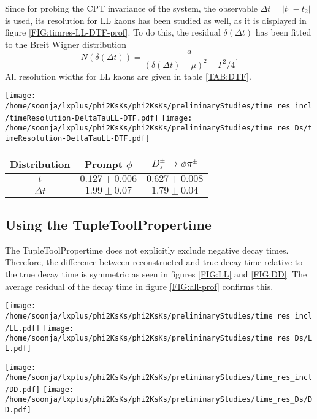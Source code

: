 Since for probing the CPT invariance of the system, the observable $\Delta t = |t_1 - t_2|$ is used, its resolution for LL kaons has been studied as well, as it is displayed in figure \ref{FIG:timres-LL-DTF-prof}. To do this, the residual $\delta(\Delta t)$ has been fitted to the Breit Wigner distribution 
\begin{equation}
N(\delta(\Delta t)) = \frac{a}{(\delta(\Delta t)- \mu)^2 - \Gamma^2/4}. \label{EQ:BWdeltat}
\end{equation}
All resolution widths for LL kaons are given in table \ref{TAB:DTF}.
\begin{center}
\texttt{[image: /home/soonja/lxplus/phi2KsKs/phi2KsKs/preliminaryStudies/time\_res\_incl/timeResolution-DeltaTauLL-DTF.pdf]}
\texttt{[image: /home/soonja/lxplus/phi2KsKs/phi2KsKs/preliminaryStudies/time\_res\_Ds/timeResolution-DeltaTauLL-DTF.pdf]}
\label{FIG:timres-LL-DTF-prof}
\end{center}

\begin{center}
\begin{tabular}{c|cc}
Distribution & Prompt $\phi$ & $D_s^\pm \rightarrow \phi \pi^\pm$ \\ 
\hline 
$t$ & $0.127\pm0.006$  & $0.627\pm0.008$ \\ 
$\Delta t$ & $1.99 \pm 0.07$ & $1.79 \pm 0.04$ \\ 
\end{tabular} 
 \label{TAB:DTF}
\end{center}

\subsection{Using the TupleToolPropertime}
The TupleToolPropertime does not explicitly exclude negative decay times. Therefore, the difference between reconstructed and true decay time relative to the true decay time is symmetric as seen in figures \ref{FIG:LL} and \ref{FIG:DD}. The average residual of the decay time in figure \ref{FIG:all-prof} confirms this.

\begin{center}
\texttt{[image: /home/soonja/lxplus/phi2KsKs/phi2KsKs/preliminaryStudies/time\_res\_incl/LL.pdf]}
\texttt{[image: /home/soonja/lxplus/phi2KsKs/phi2KsKs/preliminaryStudies/time\_res\_Ds/LL.pdf]}
\label{FIG:LL}

\texttt{[image: /home/soonja/lxplus/phi2KsKs/phi2KsKs/preliminaryStudies/time\_res\_incl/DD.pdf]}
\texttt{[image: /home/soonja/lxplus/phi2KsKs/phi2KsKs/preliminaryStudies/time\_res\_Ds/DD.pdf]}
\label{FIG:DD}
\end{center}


